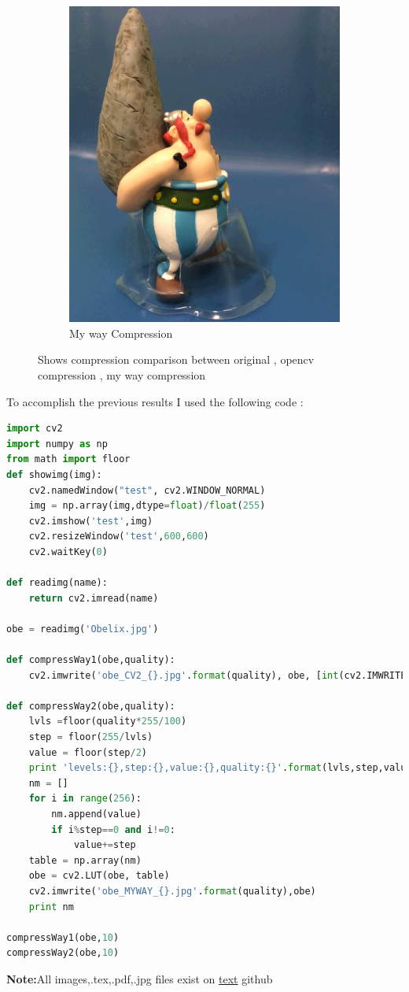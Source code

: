 \documentclass{article}
\begin{document}
\begin{figure}[H]
\begin{subfigure}{.5\textwidth}
\vspace{6mm}
  \centering
\includegraphics[scale=0.1]{obe_MYWAY_10.jpg}
  \caption{My way Compression}
  \label{fig:sfig1}
  \hspace{6mm}
\end{subfigure}
\caption{Shows compression comparison between original , opencv compression , my way compression}
\end{figure}

To accomplish the previous results I used the following code :
\begin{lstlisting}[language=Python]
import cv2
import numpy as np
from math import floor
def showimg(img):
    cv2.namedWindow("test", cv2.WINDOW_NORMAL)
    img = np.array(img,dtype=float)/float(255)
    cv2.imshow('test',img)
    cv2.resizeWindow('test',600,600)
    cv2.waitKey(0)

def readimg(name):
    return cv2.imread(name)

obe = readimg('Obelix.jpg')

def compressWay1(obe,quality):
    cv2.imwrite('obe_CV2_{}.jpg'.format(quality), obe, [int(cv2.IMWRITE_JPEG_QUALITY), quality])

def compressWay2(obe,quality):
    lvls =floor(quality*255/100)
    step = floor(255/lvls)
    value = floor(step/2)
    print 'levels:{},step:{},value:{},quality:{}'.format(lvls,step,value,quality)
    nm = []
    for i in range(256):
        nm.append(value)
        if i%step==0 and i!=0:
            value+=step
    table = np.array(nm)
    obe = cv2.LUT(obe, table)
    cv2.imwrite('obe_MYWAY_{}.jpg'.format(quality),obe)
    print nm

compressWay1(obe,10)
compressWay2(obe,10)
\end{lstlisting}

\textbf{Note:}All images,.tex,.pdf,.jpg files exist on \href{URL}{text} github
\end{document}
